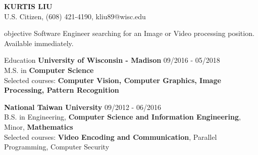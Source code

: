 \documentclass{resume} %
\begin{document}
\begin{center}
{\MakeUppercase{\bf Kurtis Liu}}\\
U.S. Citizen, (608) 421-4190, kliu89@wisc.edu
\end{center}

\begin{rSection}{objective}
Software Engineer searching for an Image or Video processing position. Available immediately.
\end{rSection}

\begin{rSection}{Education}
{\bf University of Wisconsin - Madison} \hfill {09/2016 - 05/2018}\\ 
M.S. in {\bf Computer Science} \\
Selected courses: {\bf Computer Vision, Computer Graphics, Image Processing, Pattern Recognition}


{\bf National Taiwan University} \hfill   {09/2012 - 06/2016}\\ 
B.S. in Engineering,  {\bf Computer Science and Information Engineering}, Minor, {\bf Mathematics} \\
Selected courses: {\bf Video Encoding and Communication}, Parallel Programming, Computer Security
\end{rSection}
\end{document}
